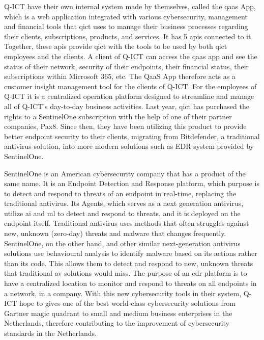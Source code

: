 Q-ICT have their own internal system made by themselves, called the \acrshort{qaas} App, which is a web application integrated with
various cybersecurity,  management and financial tools that \acrshort{qict} uses to manage their business processes regarding their clients,
subscriptions, products, and services. It has 5 \acrshort{api}s connected to it. Together, these \acrshort{api}s provide \acrshort{qict} with
the tools to be used by both \acrshort{qict} employees and the clients. A client of Q-ICT can access the \acrshort{qaas} app and see the status
of their network, security of their endpoints, their financial status, their subscriptions within Microsoft 365, etc. The QaaS App therefore
acts as a customer insight management tool for the clients of Q-ICT. For the employees of Q-ICT it is a centralized operation platform designed
to streamline and manage all of Q-ICT's day-to-day business activities. Last year, \acrshort{qict} has purchased the rights to a SentinelOne
subscription with the help of one of their partner companies, Pax8. Since then, they have been utilizing this product to provide better endpoint
security to their clients, migrating from Bitdefender, a traditional antivirus solution, into more modern solutions such as EDR system provided
by SentinelOne.

SentinelOne is an American cybersecurity company that has a product of the same name. It is an Endpoint Detection and Response platform, which
purpose is to detect and respond to threats of an endpoint in real-time, replacing the traditional antivirus. Its Agents, which serves as
a next generation antivirus, utilize \acrshort{ai} and \acrshort{ml} to detect and respond to threats, and it is deployed on the endpoint itself.
Traditional antivirus uses methods that often struggles against new, unknown (zero-day) threats and malware that changes frequently. SentinelOne,
on the other hand, and other similar next-generation antivirus solutions use behavioural analysis to identify malware based on its actions rather than its code.
This allows them to detect and respond to new, unknown threats that traditional \acrshort{av} solutions would miss.
The purpose of an \acrshort{edr} platform is to have a centralized location to monitor and respond to threats on all endpoints in a network,
in a company. With this new cybersecurity tools in their system, Q-ICT hope to gives one of the best world-class cybersecurity solutions from Gartner
magic quadrant to small and medium business enterprises in the Netherlands, therefore contributing to the improvement of cybersecurity standards
in the Netherlands.

